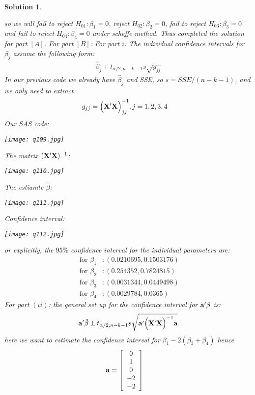 \documentclass[11pt]{article}
\newtheorem{sol}{Solution}
\begin{document}
\begin{sol}
\begin{center}
	\end{center}	
	so we will fail to reject $H_{01}: \beta_1 = 0$, reject $H_{02}: \beta_2 = 0$, fail to reject $H_{03}: \beta_3 = 0$ and fail to reject $H_{04}: \beta_4 = 0$ under scheffe method.\vskip 2mm
	Thus completed the solution for part $[A]$.\vskip 2mm
	For part $[B]$:\vskip 2mm
	For part ${i}$: The individual confidence intervals for $\beta_j$ assume the following form:
	\begin{align*}
		\hat{\beta}_j \pm t_{\alpha/2, n - k - 1} s\sqrt{g_{jj}}
	\end{align*}
 	In our previous code we already have $\hat{\beta}_j$ and SSE, so $s = SSE/(n - k - 1)$, and we only need to extract
 	\begin{align*}
 		g_{jj} &= \Big({\bf X}'{\bf X}\Big)^{-1}_{jj}, j = 1, 2, 3, 4
 	\end{align*}
 	Our SAS code:
 	\begin{center}
		\texttt{[image: q109.jpg]}
	\end{center}	
	The matrix $({\bf X}'{\bf X})^{-1}$:
	\begin{center}
		\texttt{[image: q110.jpg]}
	\end{center}	
	The estiamte $\hat{\beta}$:
	\begin{center}
		\texttt{[image: q111.jpg]}
	\end{center}	
	Confidence interval:
	\begin{center}
		\texttt{[image: q112.jpg]}
	\end{center}
	or explicitly, the $95\%$ confidence interval for the individual parameters are:
	\begin{align*}
		\text{ for }\beta_1&: (0.0210695, 0.1503176)\\
		\text{ for }\beta_2&: (0.254352, 0.7824815)\\
		\text{ for }\beta_3&: (0.0031344, 0.0449498)\\
		\text{ for }\beta_4&: (0.0029784, 0.0365)
	\end{align*}
	For part $(ii)$:\vskip 2mm
	the general set up for the confidence interval for ${\bf a}'\beta$ is:
	\begin{align*}
		{\bf a}'\hat{\beta} \pm t_{\alpha/2, n - k - 1}s\sqrt{{\bf a}'\Big({\bf X}'{\bf X}\Big)^{-1}{\bf a}}
	\end{align*}
	here we want to estimate the confidence interval for $\beta_1 - 2(\beta_3 + \beta_4)$ hence
	\begin{align*}
		{\bf a}  &= \left[\begin{array}{c} 0 \\ 1\\ 0\\ -2\\ -2\end{array}\right]

\end{align*}
\end{sol}
\end{document}
